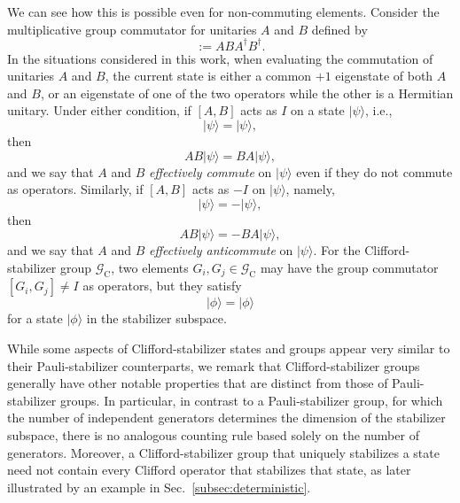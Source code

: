 \documentclass[
 reprint,
 amsmath,amssymb,
 pra,superscriptaddress, nofootinbib
]{revtex4-2}
\theoremstyle{definition}
\theoremstyle{plain}
\begin{document}
We can see how this is possible even for non-commuting elements.  Consider the multiplicative group commutator for unitaries $A$ and $B$ defined by
\begin{equation}
[A,B]:=ABA^\dagger B^\dagger.
\label{eq:group_commutator_def}
\end{equation}
In the situations considered in this work, when evaluating the commutation of unitaries $A$ and $B$, the current state is either a common $+1$ eigenstate of both $A$ and $B$, or an eigenstate of one of the two operators while the other is a Hermitian unitary. Under either condition, if $[A,B]$ acts as $I$ on a state $|\psi\rangle$, i.e.,
\begin{equation}
[A,B]|\psi\rangle=|\psi\rangle,
\label{eq:commutator_i}
\end{equation}
then 
\begin{equation}
AB|\psi\rangle=BA|\psi\rangle,
\end{equation}
and we say that $A$ and $B$ \emph{effectively commute} on $|\psi\rangle$ even if they do not commute as operators. Similarly, if $[A,B]$ acts as $-I$ on $|\psi\rangle$, namely,
\begin{equation}
[A,B]|\psi\rangle=-|\psi\rangle,
\label{eq:commutator_minus_i}
\end{equation}
then
\begin{equation}
AB|\psi\rangle=-BA|\psi\rangle,
\end{equation}
and we say that $A$ and $B$ \textit{effectively anticommute} on $|\psi\rangle$. 
For the Clifford-stabilizer group $\mathcal{G}_\mathrm{C}$, two elements $G_i, G_j \in \mathcal{G}_\mathrm{C}$ may have the group commutator $[G_i,G_j] \neq I$ as operators, but they satisfy 
\begin{equation}
[G_i,G_j]|\phi\rangle=|\phi\rangle
\end{equation}
for a state $|\phi\rangle$ in the stabilizer subspace.

While some aspects of Clifford-stabilizer states and groups appear very similar to their Pauli-stabilizer counterparts, we remark that Clifford-stabilizer groups generally have other notable properties that are distinct from those of Pauli-stabilizer groups. In particular, in contrast to a Pauli-stabilizer group, for which the number of independent generators determines the dimension of the stabilizer subspace, there is no analogous counting rule based solely on the number of generators.
Moreover, a Clifford-stabilizer group that uniquely stabilizes a state need not contain every Clifford operator that stabilizes that state, as later illustrated by an example in Sec.~\ref{subsec:deterministic}.
\end{document}
